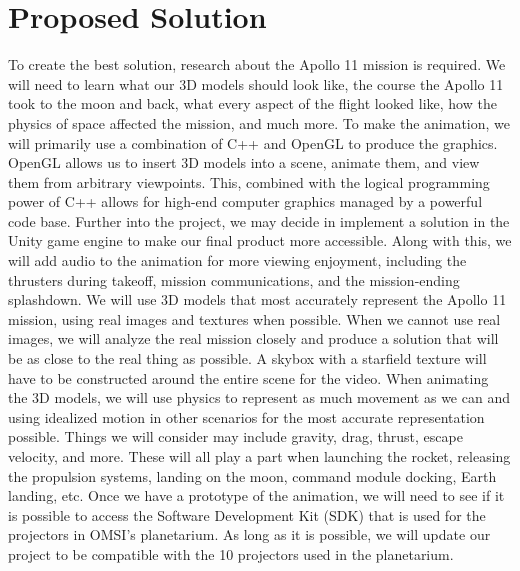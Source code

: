 \documentclass[onecolumn, draftclsnofoot,10pt, compsoc]{IEEEtran}
\begin{document}
\section{Proposed Solution}
To create the best solution, research about the Apollo 11 mission is required. We will need to learn what our 3D models should look like, the course the Apollo 11 took to the moon and back, what every aspect of the flight looked like, how the physics of space affected the mission, and much more. To make the animation, we will primarily use a combination of C++ and OpenGL to produce the graphics. OpenGL allows us to insert 3D models into a scene, animate them, and view them from arbitrary viewpoints. This, combined with the logical programming power of C++ allows for high-end computer graphics managed by a powerful code base. Further into the project, we may decide in implement a solution in the Unity game engine to make our final product more accessible. Along with this, we will add audio to the animation for more viewing enjoyment, including the thrusters during takeoff, mission communications, and the mission-ending splashdown.
\newline
\newline
We will use 3D models that most accurately represent the Apollo 11 mission, using real images and textures when possible. When we cannot use real images, we will analyze the real mission closely and produce a solution that will be as close to the real thing as possible. A skybox with a starfield texture will have to be constructed around the entire scene for the video. When animating the 3D models, we will use physics to represent as much movement as we can and using idealized motion in other scenarios for the most accurate representation possible. Things we will consider may include gravity, drag, thrust, escape velocity, and more. These will all play a part when launching the rocket, releasing the propulsion systems, landing on the moon, command module docking, Earth landing, etc. Once we have a prototype of the animation, we will need to see if it is possible to access the Software Development Kit (SDK) that is used for the projectors in OMSI's planetarium. As long as it is possible, we will update our project to be compatible with the 10 projectors used in the planetarium. 
\end{document}
